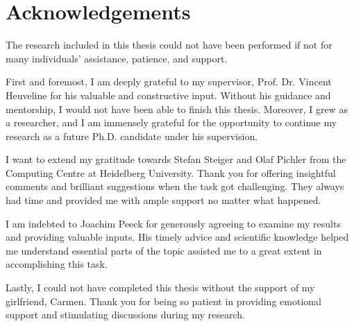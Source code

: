 \chapter*{Acknowledgements}
\thispagestyle{empty}


The research included in this thesis could not have been performed if not for many individuals' assistance, patience, and support. 
 
First and foremost, I am deeply grateful to my supervisor, Prof. Dr. Vincent Heuveline for his valuable and constructive input.
Without his guidance and mentorship,
I would not have been able to finish this thesis.
Moreover, I grew as a researcher, and I am immensely grateful for the opportunity to continue my research as a future Ph.D. candidate under his supervision. 

I want to extend my gratitude towards Stefan Steiger and Olaf Pichler from the Computing Centre at Heidelberg University.
Thank you for offering insightful comments and brilliant suggestions when the task got challenging.
They always had time and provided me with ample support no matter what happened.

I am indebted to Joachim Peeck for generously agreeing to examine my results and providing valuable inputs.
His timely advice and scientific knowledge helped me understand essential parts of the topic assisted me to a great extent in accomplishing this task.

Lastly, I could not have completed this thesis without the support of my girlfriend, Carmen.
Thank you for being so patient in providing emotional support and stimulating discussions during my research.